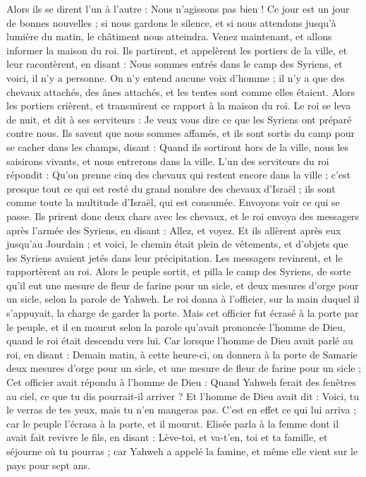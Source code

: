 \begin{multicols}{2}
Alors ils se dirent l’un à l’autre : Nous n’agissons pas bien ! Ce jour est un jour de bonnes nouvelles ; si nous gardons le silence, et si nous attendons jusqu’à lumière du matin, le châtiment nous atteindra. Venez maintenant, et allons informer la maison du roi.
Ils partirent, et appelèrent les portiers de la ville, et leur racontèrent, en disant : Nous sommes entrés dans le camp des Syriens, et voici, il n’y a personne. On n’y entend aucune voix d’homme ; il n’y a que des chevaux attachés, des ânes attachés, et les tentes sont comme elles étaient.
Alors les portiers crièrent, et transmirent ce rapport à la maison du roi.
Le roi se leva de nuit, et dit à ses serviteurs : Je veux vous dire ce que les Syriens ont préparé contre nous. Ils savent que nous sommes affamés, et ils sont sortis du camp pour se cacher dans les champs, disant : Quand ils sortiront hors de la ville, nous les saisirons vivants, et nous entrerons dans la ville.
L’un des serviteurs du roi répondit : Qu’on prenne cinq des chevaux qui restent encore dans la ville ; c’est presque tout ce qui est resté du grand nombre des chevaux d’Israël ; ils sont comme toute la multitude d’Israël, qui est consumée. Envoyons voir ce qui se passe.
Ils prirent donc deux chars avec les chevaux, et le roi envoya des messagers après l’armée des Syriens, en disant : Allez, et voyez.
Et ils allèrent après eux jusqu’au Jourdain ; et voici, le chemin était plein de vêtements, et d’objets que les Syriens avaient jetés dans leur précipitation. Les messagers revinrent, et le rapportèrent au roi.
Alors le peuple sortit, et pilla le camp des Syriens, de sorte qu’il eut une mesure de fleur de farine pour un sicle, et deux mesures d’orge pour un sicle, selon la parole de Yahweh.
Le roi donna à l’officier, sur la main duquel il s’appuyait, la charge de garder la porte. Mais cet officier fut écrasé à la porte par le peuple, et il en mourut selon la parole qu’avait prononcée l’homme de Dieu, quand le roi était descendu vers lui.
Car lorsque l’homme de Dieu avait parlé au roi, en disant : Demain matin, à cette heure-ci, on donnera à la porte de Samarie deux mesures d’orge pour un sicle, et une mesure de fleur de farine pour un sicle ;
Cet officier avait répondu à l’homme de Dieu : Quand Yahweh ferait des fenêtres au ciel, ce que tu dis pourrait-il arriver ? Et l’homme de Dieu avait dit : Voici, tu le verras de tes yeux, mais tu n’en mangeras pas.
C’est en effet ce qui lui arriva ; car le peuple l’écrasa à la porte, et il mourut.
\VerseOne{}Elisée parla à la femme dont il avait fait revivre le fils, en disant : Lève-toi, et va-t’en, toi et ta famille, et séjourne où tu pourras ; car Yahweh a appelé la famine, et même elle vient sur le pays pour sept ans.

\end{multicols}
